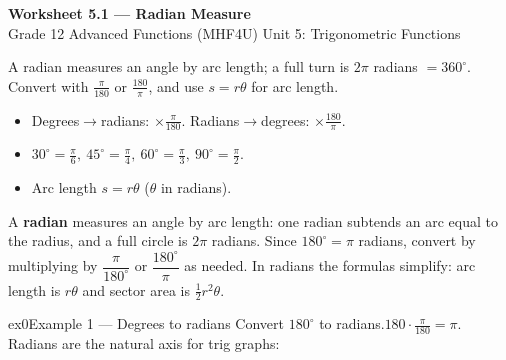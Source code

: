 \documentclass[11pt]{article}
\begin{document}
\begin{center}
{\LARGE\bfseries\color{titleblue}Worksheet 5.1 --- Radian Measure}\\[2pt]
{\small Grade 12 Advanced Functions (MHF4U) \textperiodcentered{} Unit 5: Trigonometric Functions}
\end{center}

\begin{ideabox}
A radian measures an angle by arc length; a full turn is $2\pi$ radians $=360^\circ$. Convert with $\tfrac{\pi}{180}$ or $\tfrac{180}{\pi}$, and use $s=r\theta$ for arc length.
\begin{itemize}[leftmargin=*,itemsep=2pt]
  \item Degrees$\to$radians: $\times\tfrac{\pi}{180}$. Radians$\to$degrees: $\times\tfrac{180}{\pi}$.
  \item $30^\circ=\tfrac{\pi}{6},\ 45^\circ=\tfrac{\pi}{4},\ 60^\circ=\tfrac{\pi}{3},\ 90^\circ=\tfrac{\pi}{2}$.
  \item Arc length $s=r\theta$ ($\theta$ in radians).
\end{itemize}
\end{ideabox}

\begin{learnbox}
A \textbf{radian} measures an angle by arc length: one radian subtends an arc equal to the radius, and a full circle is $2\pi$ radians.
Since $180^\circ=\pi$ radians, convert by multiplying by $\dfrac{\pi}{180^\circ}$ or $\dfrac{180^\circ}{\pi}$ as needed.
In radians the formulas simplify: arc length is $r\theta$ and sector area is $\tfrac12 r^2\theta$.
\end{learnbox}


\begin{example}{ex0}{Example 1 --- Degrees to radians}
Convert $180^\circ$ to radians.\soln $180\cdot\tfrac{\pi}{180}=\pi$. Radians are the natural axis for trig graphs:\begin{center}\end{center}
\end{example}
\end{document}
